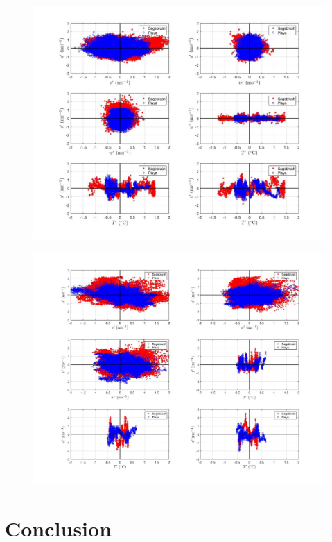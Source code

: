 \documentclass[]{article}
\begin{document}
\begin{figure}
	\centering
	\includegraphics[width=\textwidth]{momentum_corr_05m}
	\caption{}
	\label{fig:u_T}
\end{figure}

\begin{figure}
	\centering
	\includegraphics[width=\textwidth]{momentum_corr_20m}
	\caption{}
	\label{fig:u_T}
\end{figure}



\section{Conclusion}
\end{document}
